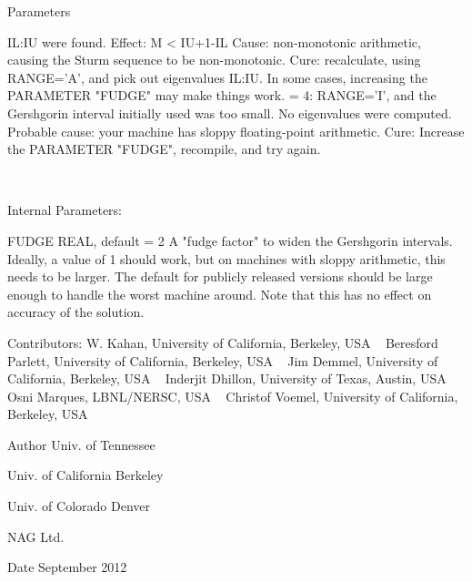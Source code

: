 \begin{DoxyParams}[1]{Parameters}
\begin{DoxyVerb}
                        IL:IU were found.
                        Effect: M < IU+1-IL
                        Cause:  non-monotonic arithmetic, causing the
                                Sturm sequence to be non-monotonic.
                        Cure:   recalculate, using RANGE='A', and pick
                                out eigenvalues IL:IU.  In some cases,
                                increasing the PARAMETER "FUDGE" may
                                make things work.
                = 4:    RANGE='I', and the Gershgorin interval
                        initially used was too small.  No eigenvalues
                        were computed.
                        Probable cause: your machine has sloppy
                                        floating-point arithmetic.
                        Cure: Increase the PARAMETER "FUDGE",
                              recompile, and try again.\end{DoxyVerb}
 \\
\hline
\end{DoxyParams}
\begin{DoxyParagraph}{Internal Parameters\+: }
\begin{DoxyVerb}  FUDGE   REAL, default = 2
          A "fudge factor" to widen the Gershgorin intervals.  Ideally,
          a value of 1 should work, but on machines with sloppy
          arithmetic, this needs to be larger.  The default for
          publicly released versions should be large enough to handle
          the worst machine around.  Note that this has no effect
          on accuracy of the solution.\end{DoxyVerb}

\end{DoxyParagraph}
\begin{DoxyParagraph}{Contributors\+: }
W. Kahan, University of California, Berkeley, U\+S\+A ~\newline
 Beresford Parlett, University of California, Berkeley, U\+S\+A ~\newline
 Jim Demmel, University of California, Berkeley, U\+S\+A ~\newline
 Inderjit Dhillon, University of Texas, Austin, U\+S\+A ~\newline
 Osni Marques, L\+B\+N\+L/\+N\+E\+R\+S\+C, U\+S\+A ~\newline
 Christof Voemel, University of California, Berkeley, U\+S\+A ~\newline
 
\end{DoxyParagraph}
\begin{DoxyAuthor}{Author}
Univ. of Tennessee 

Univ. of California Berkeley 

Univ. of Colorado Denver 

N\+A\+G Ltd. 
\end{DoxyAuthor}
\begin{DoxyDate}{Date}
September 2012 
\end{DoxyDate}
\hypertarget{group__auxOTHERauxiliary_ga4a2b9dcf8e9c8f368fb6d39506781f46}{}
